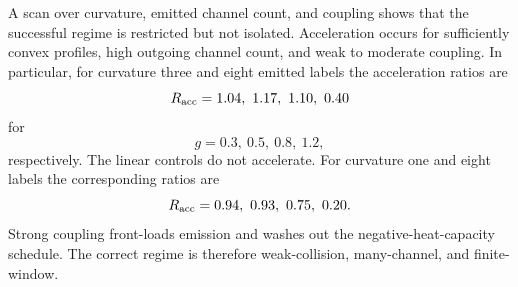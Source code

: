 A scan over curvature, emitted channel count, and coupling shows that the successful regime is restricted but not isolated. Acceleration occurs for sufficiently convex profiles, high outgoing channel count, and weak to moderate coupling. In particular, for curvature three and eight emitted labels the acceleration ratios are
\begin{equation}
  R_{\rm acc}=1.04,\ 1.17,\ 1.10,\ 0.40
\end{equation}
for
\begin{equation}
  g=0.3,\ 0.5,\ 0.8,\ 1.2,
\end{equation}
respectively. The linear controls do not accelerate. For curvature one and eight labels the corresponding ratios are
\begin{equation}
  R_{\rm acc}=0.94,\ 0.93,\ 0.75,\ 0.20.
\end{equation}
Strong coupling front-loads emission and washes out the negative-heat-capacity schedule. The correct regime is therefore weak-collision, many-channel, and finite-window.
